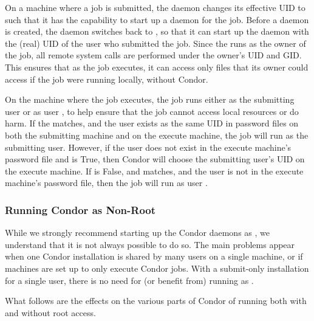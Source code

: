 On a machine where a job is submitted,
the  daemon
changes its effective UID to 
such that it has the capability to start up a  daemon
for the job.
Before a  daemon is created,
the  daemon
switches back to ,
so that it can start up the  daemon with the (real) UID
of the user who submitted the job.
Since the  runs as the owner of the job,
all remote system calls are performed under the owner's UID
and GID.
This ensures that as the job executes,
it can access only files that its owner could access if the job
were running locally, without Condor.

On the machine where the job executes, the 
job runs either as the submitting user or as user ,
to help ensure that the job cannot access local resources or do harm.  
If the  matches,
and the user exists as the same UID in password files
on both the submitting machine and on the execute machine,
the job will run as the submitting user.
However, if the user does not exist in the execute machine's
password file and  is True,
then Condor will choose the submitting user's UID on the
execute machine.
If  is False,
and  matches,
and the user is not in the execute machine's password file,
then the job will run as user .

\subsubsection{\label{sec:Non-Root}Running Condor as Non-Root}

While we strongly recommend starting up the Condor daemons as ,
we understand that it is not always possible to do so.
The main problems
appear when one Condor installation is shared by many users on a
single machine, or if machines are set up to only execute
Condor jobs.  With a submit-only installation for a
single user, there is no need for (or benefit from) running as
.

What follows are the effects on the various parts of Condor of running
both with and without root access.

